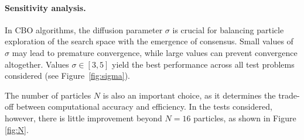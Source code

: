 \documentclass{article}
\theoremstyle{plain}
\theoremstyle{definition}
\theoremstyle{remark}
\begin{document}
%
%

\paragraph{Sensitivity analysis.} In CBO algorithms, the diffusion parameter $\sigma$ is crucial for balancing particle exploration of the search space with the emergence of consensus. Small values of $\sigma$ may lead to premature convergence, while large values can prevent convergence altogether. Values $\sigma \in [3,5]$ yield the best performance across all test problems considered (see Figure~\ref{fig:sigma}).


The number of particles $N$ is also an important choice, as it determines the trade-off between computational accuracy and efficiency. In the tests considered, however, there is little improvement beyond $N = 16$ particles, as shown in Figure \ref{fig:N}.
\end{document}
